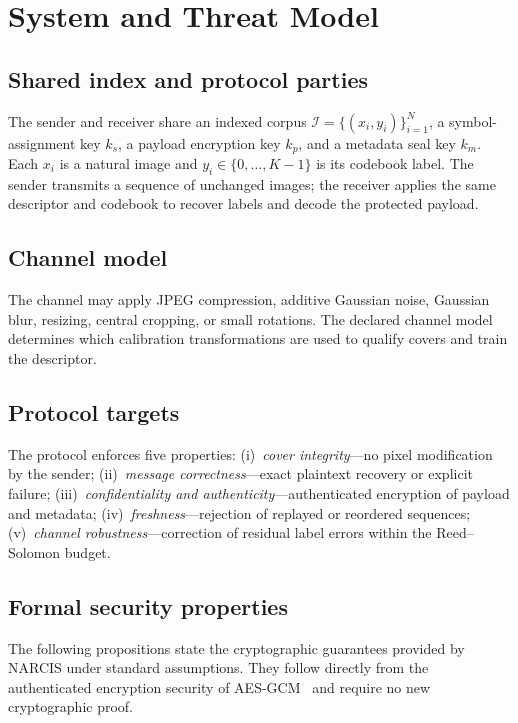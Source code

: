 ﻿\documentclass[10pt,journal]{IEEEtran}
\newcommand{\method}{NARCIS\xspace}
\begin{document}
\section{System and Threat Model}
\label{sec:model}

\subsection{Shared index and protocol parties}

The sender and receiver share an indexed corpus
$\mathcal{I}=\{(x_i,y_i)\}_{i=1}^{N}$, a symbol-assignment key $k_s$,
a payload encryption key $k_p$, and a metadata seal key $k_m$. Each
$x_i$ is a natural image and $y_i\in\{0,\ldots,K-1\}$ is its codebook
label. The sender transmits a sequence of unchanged images; the receiver
applies the same descriptor and codebook to recover labels and decode
the protected payload.

\subsection{Channel model}

The channel may apply JPEG compression, additive Gaussian noise,
Gaussian blur, resizing, central cropping, or small rotations. The
declared channel model determines which calibration transformations are
used to qualify covers and train the descriptor.

\subsection{Protocol targets}

The protocol enforces five properties:
(i)~\emph{cover integrity}---no pixel modification by the sender;
(ii)~\emph{message correctness}---exact plaintext recovery or explicit
     failure;
(iii)~\emph{confidentiality and authenticity}---authenticated
     encryption of payload and metadata;
(iv)~\emph{freshness}---rejection of replayed or reordered sequences;
(v)~\emph{channel robustness}---correction of residual label errors
    within the Reed--Solomon budget.

\subsection{Formal security properties}

The following propositions state the cryptographic guarantees
provided by \method under standard assumptions. They follow directly
from the authenticated encryption security of AES-GCM~\cite{nist2007gcm}
and require no new cryptographic proof.
\end{document}
